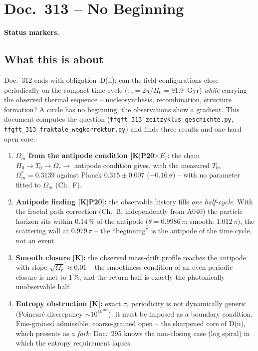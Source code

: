 \maketitle
\tableofcontents

\chapter*{Doc.~313 -- No Beginning}

\medskip\noindent\textbf{Status markers.}


\section*{What this is about}

Doc.~312 ends with obligation~D(ii): can the field configurations
close periodically on the compact time cycle
($\tau_c = 2\pi/H_0 = 91.9$~Gyr) \emph{while} carrying the observed
thermal sequence -- nucleosynthesis, recombination, structure
formation? A circle has no beginning; the observations show a
gradient. This document computes the question
(\texttt{ffgft\_313\_zeitzyklus\_geschichte.py},
\texttt{ffgft\_313\_fraktale\_wegkorrektur.py}) and finds three
results and one hard open core:

\begin{enumerate}
  \item \textbf{$\Omega_m$ from the antipode condition
        [K$|$P20$\times E$]:} the chain
        $H_0 \to T_0 \to \Omega_r \to$ antipode condition gives,
        with the measured $T_0$, $\Omega_m^{*} = 0.3139$ against
        Planck $0.315\pm0.007$ ($-0.16\,\sigma$) -- with no
        parameter fitted to $\Omega_m$ (Ch.~F).
  \item \textbf{Antipode finding [K$|$P20]:} the observable
        history fills \emph{one half-cycle}. With the fractal
        path correction (Ch.~B, independently from A040) the
        particle horizon sits within $0.14\,\%$ of the antipode
        ($\theta = 0.9986\,\pi$; smooth: $1.012\,\pi$), the
        scattering wall at $0.979\,\pi$ -- the
        \enquote{beginning} is the antipode of the time cycle,
        not an event.
  \item \textbf{Smooth closure [K]:} the observed mass-drift
        profile reaches the antipode with slope
        $\sqrt{\Omega_r} \approx 0.01$ -- the smoothness condition
        of an even periodic closure is met to $1\,\%$, and the
        return half is exactly the photonically unobservable half.
  \item \textbf{Entropy obstruction [K]:} exact $\tau_c$
        periodicity is not dynamically generic (Poincaré
        discrepancy $\sim 10^{10^{104}}$); it must be imposed as a
        boundary condition. Fine-grained admissible,
        coarse-grained open -- the sharpened core of D(ii), which
        presents as a \emph{fork}: Doc.~295 knows the
        non-closing case (log spiral) in which the entropy
        requirement lapses.
\end{enumerate}

